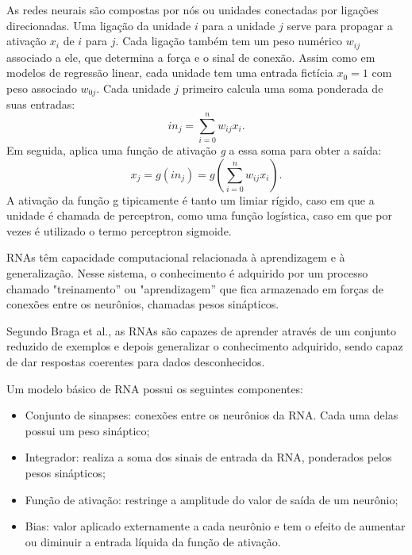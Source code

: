 \documentclass[a4paper,11pt]{article}
\begin{document}
		As redes neurais são compostas por nós ou unidades conectadas por ligações direcionadas. Uma ligação da unidade $i$ para a unidade $j$ serve para propagar a ativação $x_i$ de $i$ para $j$. Cada ligação também tem um peso numérico $w_{ij}$ associado a ele, que determina a força e o sinal de conexão. Assim como em modelos de regressão linear, cada unidade tem uma entrada fictícia $x_0 = 1$ com peso associado $w_{0j}$. Cada unidade $j$ primeiro calcula uma soma ponderada de suas entradas:		
		\begin{equation*}
			in_j = \sum_{i=0}^{n} w_{ij} x_i . %
		\end{equation*}		
		Em seguida, aplica uma função de ativação \textit{g} a essa soma para obter a saída:		
		\begin{equation*}
			x_j = g(in_j) = g \left(\sum_{i=0}^{n} w_{ij} x_i\right).
		\end{equation*}		
		A ativação da função g tipicamente é tanto um limiar rígido, caso em que a unidade é chamada de perceptron, como uma função logística, caso em que por vezes é utilizado o termo perceptron sigmoide. \cite{IAStuartRussell}
		
		RNAs têm capacidade computacional relacionada à aprendizagem e à generalização. Nesse sistema, o conhecimento é adquirido por um processo chamado "treinamento” ou "aprendizagem” que fica armazenado em forças de conexões entre os neurônios, chamadas pesos sinápticos. \cite{RedesNeuraisSimonHaykin}
		
		Segundo Braga et al., as RNAs são capazes de aprender através de um conjunto reduzido de exemplos e depois generalizar o conhecimento adquirido, sendo capaz de dar respostas coerentes para dados desconhecidos.
		
		Um modelo básico de RNA possui os seguintes componentes:
		
		\begin{itemize}
			
			\item Conjunto de sinapses: conexões entre os neurônios da RNA. Cada uma delas possui um peso sináptico;
			 
			\item Integrador: realiza a soma dos sinais de entrada da RNA, ponderados pelos pesos sinápticos; 
			
			\item Função de ativação: restringe a amplitude do valor de saída de um neurônio; 
			
			\item Bias: valor aplicado externamente a cada neurônio e tem o efeito de aumentar ou diminuir a entrada líquida da função de ativação.
			
		\end{itemize}
	
\end{document}
